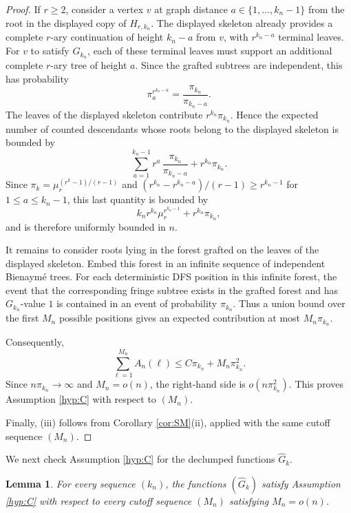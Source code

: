 \documentclass[a4paper,11pt]{article}
\newtheorem{lemma}[theorem]{Lemma}
\DeclareRobustCommand{\1}{\mathbf{1}}
\begin{document}
\begin{proof}
  If $r\ge2$, consider a vertex $v$ at graph distance
  $a\in\{1,\ldots,k_n-1\}$ from the root in the displayed copy of $H_{r,k_n}$.
  The displayed skeleton already provides a complete $r$-ary continuation of
  height $k_n-a$ from $v$, with $r^{k_n-a}$ terminal leaves. For $v$ to satisfy
  $G_{k_n}$, each of these terminal leaves must support an additional complete
  $r$-ary tree of height $a$. Since the grafted subtrees are independent, this
  has probability
  $$
    \pi_a^{r^{k_n-a}}
    =
    \frac{\pi_{k_n}}{\pi_{k_n-a}}.
  $$
  The leaves of the displayed skeleton contribute $r^{k_n}\pi_{k_n}$. Hence
  the expected number of counted descendants whose roots belong to the
  displayed skeleton is bounded by
  $$
    \sum_{a=1}^{k_n-1}r^a\,\frac{\pi_{k_n}}{\pi_{k_n-a}}
    +
    r^{k_n}\pi_{k_n}.
  $$
  Since $\pi_k=\mu_r^{(r^k-1)/(r-1)}$ and
  $(r^{k_n}-r^{k_n-a})/(r-1)\ge r^{k_n-1}$ for
  $1\le a\le k_n-1$, this last quantity is bounded by
  $$
    k_n r^{k_n}\mu_r^{r^{k_n-1}}+r^{k_n}\pi_{k_n},
  $$
  and is therefore uniformly bounded in $n$.

  It remains to consider roots lying in the forest grafted on the leaves of the
  displayed skeleton. Embed this forest in an infinite sequence of independent
  Bienaym\'e trees. For each deterministic DFS position in this infinite
  forest, the event that the corresponding fringe subtree exists in the
  grafted forest and has $G_{k_n}$-value $1$ is contained in an event of
  probability $\pi_{k_n}$. Thus a union bound over the first $M_{n}$ possible
  positions gives an expected contribution at most $M_{n}\pi_{k_n}$.

  Consequently,
  $$
    \sum_{\ell=1}^{M_{n}}A_n(\ell)
    \le
    C\pi_{k_n}+M_{n}\pi_{k_n}^2.
  $$
Since $n\pi_{k_n}\to\infty$ and $M_n=o(n)$, the right-hand side is
$o(n\pi_{k_n}^2)$. This proves Assumption \ref{hyp:C} with respect to
$(M_n)$.

Finally, \textup{(iii)} follows from Corollary
\ref{cor:SM}\textup{(ii)}, applied with the same cutoff sequence $(M_n)$.
\end{proof}

We next check Assumption \ref{hyp:C} for the declumped functions
$\widehat{G}_k$.

\begin{lemma}
  \label{lem:C_rary}
  For every sequence $(k_n)$, the functions $(\widehat{G}_k)$ satisfy
  Assumption \ref{hyp:C} with respect to every cutoff sequence $(M_n)$ satisfying $M_n=o(n)$.
\end{lemma}
\end{document}
